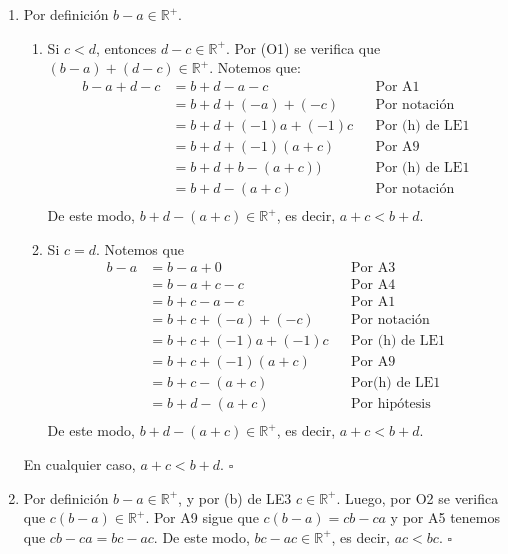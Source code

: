 \documentclass[11pt]{article}
\begin{document}
\begin{enumerate}[label=\alph*),font=\bfseries]

    \item Por definición $b-a \in \mathbb{R}^+$.
        \begin{enumerate}[label=\roman*), font=\bfseries]
        \item Si $c<d$, entonces $d-c \in \mathbb{R}^+$. Por (O1) se verifica que $(b-a)+(d-c) \in \mathbb{R}^+$. Notemos que:
        \begin{align*}
        b-a+d-c &= b+d-a-c && \text{Por A1}\\
        &= b+d+(-a)+(-c) && \text{Por notación}\\
        &= b+d+(-1)a+(-1)c && \text{Por (h) de LE1}\\
        &= b+d+ (-1) (a + c) && \text{Por A9}\\
        &= b+d + b-(a+c) \big) && \text{Por (h) de LE1}\\
        &= b+d - (a+c) && \text{Por notación}\\
        \end{align*}
        De este modo, $b+d-(a+c)\in \mathbb{R}^+$, es decir, $a+c<b+d$.
        \item Si $c=d$. Notemos que
        \begin{align*}
        b - a &= b -a + 0 && \text{Por A3}\\
        &= b-a+c-c && \text{Por A4}\\
        &= b+c-a-c && \text{Por A1}\\
        &= b+c+(-a)+(-c) && \text{Por notación}\\
        &= b+c+(-1)a+(-1)c && \text{Por (h) de LE1}\\
        &= b+c+(-1)(a+c) && \text{Por A9}\\
        &= b+c-(a+c) && \text{Por(h) de LE1}\\
        &= b+d-(a+c) && \text{Por hipótesis}\\
        \end{align*}
        De este modo, $b+d-(a+c)\in \mathbb{R}^+$, es decir, $a+c<b+d$.
        \end{enumerate}
        En cualquier caso, $a+c<b+d$. \mbox{}\hfill $\square$


    \item Por definición $b-a \in \mathbb{R}^+$, y por (b) de LE3 $c \in \mathbb{R}^+$. Luego, por O2 se verifica que $c(b-a) \in \mathbb{R}^+$. Por A9 sigue que $c(b-a)=cb-ca$ y por A5 tenemos que $cb-ca=bc-ac$. De este modo, $bc-ac \in \mathbb{R}^+$, es decir, $ac<bc$.
    \mbox{}\hfill $\square$


\end{enumerate}
\end{document}
